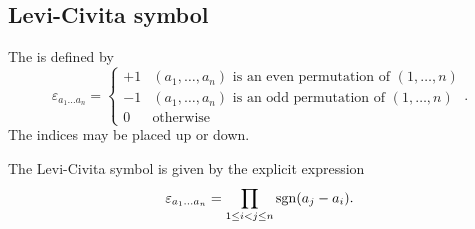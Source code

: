 \subsection{Levi-Civita symbol}
\begin{definition}
The  is defined by
\[ \varepsilon_{a_{1}\ldots a_{n}} = \begin{cases}
+1 & \text{$(a_{1},\ldots, a_{n})$ is an even permutation of $(1,\ldots, n)$} \\
-1 & \text{$(a_{1},\ldots, a_{n})$ is an odd permutation of $(1,\ldots, n)$} \\
0 & \text{otherwise}
\end{cases}.\]
The indices may be placed up or down.
\end{definition}

\begin{lemma} \label{LeviCivitaProduct}
The Levi-Civita symbol is given by the explicit expression
\[ \varepsilon_{a_{1}\ldots a_{n}} = \prod_{1\leq i<j\leq n}\operatorname{sgn}(a_j-a_i).\]
\end{lemma}

